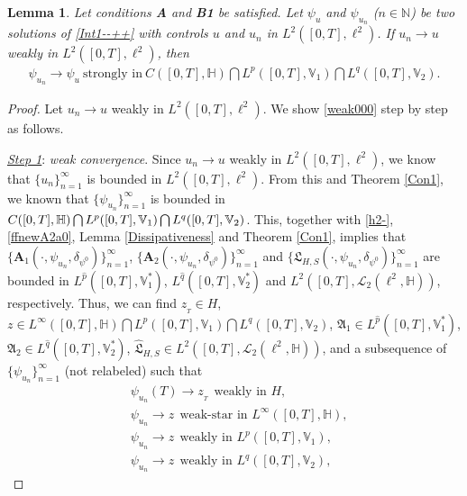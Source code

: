 \documentclass[11pt]{article}
\newtheorem{lemma}[theorem]{Lemma}
\numberwithin{equation}{section}
\begin{document}
\begin{lemma}\label{Weak-to-strog}
Let conditions \textbf{A} and \textbf{B1}
be satisfied. Let $\psi_u$ and
$\psi_{u_n}$ ($n\in\mathbb{N}$) be two solutions of \eqref{Int1--++} with controls
$u$ and $u_n$ in $L^2([0,T],\ell^2)$. If
$u_n\rightarrow u$ weakly in $L^2([0,T],\ell^2)$, then \begin{align}\label{weak000}\psi_{u_n}\rightarrow\psi_u \ \mbox{strongly in}\
C([0,T],\mathbb{H} )\bigcap L^p([0,T], \mathbb{V}_1  ) \bigcap L^q([0,T], \mathbb{V}_2).
\end{align}
\end{lemma}
\begin{proof}
Let
$u_n\rightarrow u$ weakly in $L^2([0,T],
\ell^2)$. We show \eqref{weak000}
step by step as follows.


\underline{\emph{Step 1}}: \emph{weak convergence}. Since
$u_n\rightarrow u$ weakly in $L^2([0,T],
\ell^2)$, we know that $\{u_n\}_{n=1}^\infty$ is bounded in $L^2([0,T],
\ell^2)$. From this and Theorem \ref{Con1}, we known that $\{\psi_{u_n}\}_{n=1}^\infty$ is bounded in $C([0,T],\mathbb{H} )\bigcap L^p([0,T], \mathbb{V}_1  )\\ \bigcap L^q([0,T], \mathbb{V}_2)$. This, together with \eqref{h2-}, \eqref{ffnewA2a0}, Lemma \ref{Dissipativeness} and Theorem \ref{Con1}, implies that $\{\mathbf{A}_1(\cdot,\psi_{u_n},
\delta_{\psi^0})\}_{n=1}^\infty$, $\{\mathbf{A}_2(\cdot,\psi_{u_n},
\delta_{\psi^0})\}_{n=1}^\infty$ and $\{\mathfrak{L}_{H,S}(\cdot,\psi_{u_n},
\delta_{\psi^0})\}_{n=1}^\infty$ are bounded in
$L^{\widehat{p}}([0,T], \mathbb{V}_1^*)$, $L^{\widehat{q}}([0,T], \mathbb{V}_2^*)$ and $L^2([0,T],\mathcal{L}_2(\ell^2,
\mathbb{H}))$, respectively. Thus, we can find $z_{_{T}}\in H$, $z\in L^\infty([0,T],\mathbb{H} )\bigcap L^p([0,T], \mathbb{V}_1  ) \bigcap L^q([0,T],
\mathbb{V}_2)$, $\mathfrak{A}_1\in L^{\widehat{p}}([0,T], \mathbb{V}^*_1)$, $\mathfrak{A}_2\in L^{\widehat{q}}([0,T], \mathbb{V}^*_2)$, $\widehat{\mathfrak{L}}_{H,S}
\in L^2([0,T],\mathcal{L}_2(\ell^2,
\mathbb{H}))$, and a subsequence of $\{\psi_{u_n}\}_{n=1}^\infty$ (not relabeled) such that
\begin{subequations}
\begin{align}
\label{weak0}&
\psi_{u_n}(T)\rightarrow z_{_{T}} \ \
\mbox{weakly in $H$},
\\&\label{weak1}
\psi_{u_n}\rightarrow z\ \
			\mbox{weak-star in $L^\infty([0,T],\mathbb{H} )
				$},
			\\&\label{weak2}
			\psi_{u_n}\rightarrow z\ \
\mbox{weakly in $L^p([0,T], \mathbb{V}_1)$},		\\&\label{weak2a}\psi_{u_n}\rightarrow z\ \  \mbox{weakly in $L^q([0,T], \mathbb{V}_2  )$},

\end{align}
\end{subequations}
\end{proof}
\end{document}
